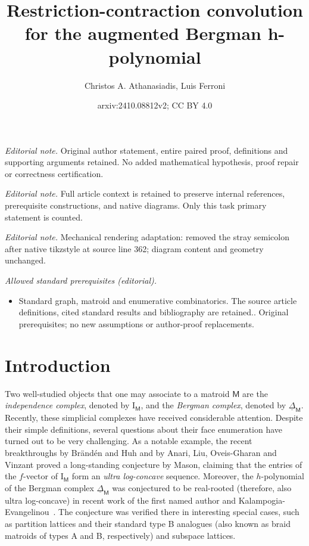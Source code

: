 \documentclass[11pt]{amsart}
\title{Restriction-contraction convolution for the augmented Bergman h-polynomial}
\author{Christos A. Athanasiadis, Luis Ferroni}
\date{arxiv:2410.08812v2; CC BY 4.0}
\theoremstyle{theorems}
\theoremstyle{definition}
\newcommand{\M}{{\mathsf{M}}}
\newcommand{\I}{{\mathrm{I}}}
\newcommand{\uDelta}{\underline{\Delta}}
\begin{document}
\maketitle
\noindent\textit{Editorial note.} Original author statement, entire paired proof, definitions and supporting arguments retained. No added mathematical hypothesis, proof repair or correctness certification.\par\medskip
\noindent\textit{Editorial note.} Full article context is retained to preserve internal references, prerequisite constructions, and native diagrams. Only this task primary statement is counted.\par\medskip
\noindent\textit{Editorial note.} Mechanical rendering adaptation: removed the stray semicolon after native tikzstyle at source line 362; diagram content and geometry unchanged.\par\medskip
\noindent\textit{Allowed standard prerequisites (editorial).}\begin{itemize}
\item Standard graph, matroid and enumerative combinatorics. The source article definitions, cited standard results and bibliography are retained.. Original prerequisites; no new assumptions or author-proof replacements.
\end{itemize}\medskip
\section{Introduction}
\label{sec:intro}

Two well-studied objects that one may associate to a matroid $\M$ are the 
\emph{independence complex}, denoted by $\I_{\M}$, and the \emph{Bergman 
complex}, denoted by $\uDelta_{\M}$. Recently, these simplicial complexes 
have received considerable attention. Despite their simple definitions, 
several questions about their face enumeration have turned out to be very 
challenging. As a notable example, the recent breakthroughs by Br\"and\'en 
and Huh \cite{BH20} and by Anari, Liu, Oveis-Gharan and Vinzant 
\cite{ALOV24} proved a long-standing conjecture by Mason, claiming that 
the entries of the $f$-vector of $\I_{\M}$ form an \emph{ultra 
log-concave} sequence. Moreover, the $h$-polynomial of the Bergman complex 
$\uDelta_{\M}$ was conjectured to be real-rooted (therefore, also ultra 
log-concave) in recent work of the first named author and 
Kalampogia-Evangelinou~\cite{AK23}. The conjecture was verified there
in interesting special cases, such as partition lattices and their 
standard type B analogues (also known as braid matroids of types A and B,
respectively) and subspace lattices.
\end{document}
